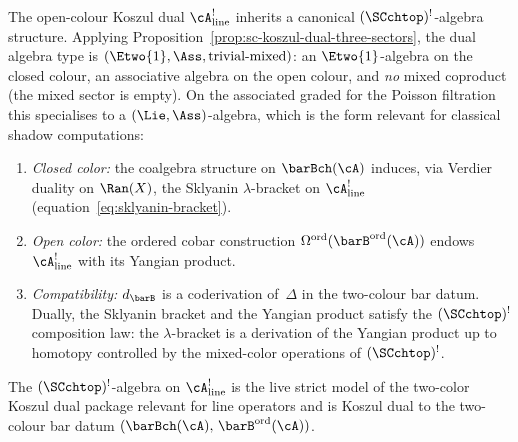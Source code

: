 \begin{theorem}
\label{thm:dual-sc-algebra}
The open-colour Koszul dual $\cA^!_{\mathrm{line}}$ inherits a canonical
$(\SCchtop)^{!}$-algebra structure. Applying
Proposition~\ref{prop:sc-koszul-dual-three-sectors}, the dual
algebra type is $(\Etwo\{1\},\Ass,\text{trivial-mixed})$: an
$\Etwo\{1\}$-algebra on the closed colour, an associative algebra
on the open colour, and \emph{no} mixed coproduct (the mixed
sector is empty). On the associated graded for the Poisson
filtration this specialises to a $(\Lie,\Ass)$-algebra, which
is the form relevant for classical shadow computations:
\begin{enumerate}[label=\textup{(\roman*)}]
\item \emph{Closed color:} the coalgebra structure on
 $\barBch(\cA)$ induces, via Verdier duality on $\Ran(X)$,
 the Sklyanin $\lambda$-bracket on $\cA^!_{\mathrm{line}}$
 (equation~\eqref{eq:sklyanin-bracket}).
\item \emph{Open color:} the ordered cobar construction
 $\Omega^{\mathrm{ord}}(\barB^{\mathrm{ord}}(\cA))$ endows
 $\cA^!_{\mathrm{line}}$ with its Yangian product.
\item \emph{Compatibility:} $d_{\barB}$ is a coderivation
 of~$\Delta$ in the two-colour bar datum. Dually, the
 Sklyanin bracket and the Yangian product satisfy the
 $(\SCchtop)^{!}$ composition law: the $\lambda$-bracket is a
 derivation of the Yangian product up to homotopy controlled
 by the mixed-color operations of $(\SCchtop)^{!}$.
\end{enumerate}
The $(\SCchtop)^{!}$-algebra on $\cA^!_{\mathrm{line}}$ is the live
strict model of the two-color Koszul dual package relevant for
line operators and is Koszul dual to the
two-colour bar datum $(\barBch(\cA),\, \barB^{\mathrm{ord}}(\cA))$.
\end{theorem}


